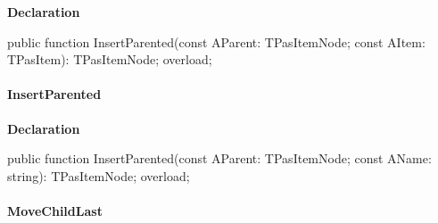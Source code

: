 \documentclass{report}
\newif\ifpdf
\begin{document}
\label{PasDoc_HierarchyTree.TStringCardinalTree-InsertParented}
\begin{list}{}{
\setlength{\itemindent}{0cm}
\setlength{\listparindent}{0cm}
\setlength{\leftmargin}{\evensidemargin}
\addtolength{\leftmargin}{\tmplength}
\settowidth{\labelsep}{X}
\addtolength{\leftmargin}{\labelsep}
\setlength{\labelwidth}{\tmplength}
}
\item[\textbf{Declaration}\hfill]
\ifpdf
\begin{flushleft}
\fi
\begin{ttfamily}
public function InsertParented(const AParent: TPasItemNode; const AItem: TPasItem): TPasItemNode; overload;\end{ttfamily}

\ifpdf
\end{flushleft}
\fi

\end{list}
\paragraph*{InsertParented}\hspace*{\fill}

\label{PasDoc_HierarchyTree.TStringCardinalTree-InsertParented}
\begin{list}{}{
\setlength{\itemindent}{0cm}
\setlength{\listparindent}{0cm}
\setlength{\leftmargin}{\evensidemargin}
\addtolength{\leftmargin}{\tmplength}
\settowidth{\labelsep}{X}
\addtolength{\leftmargin}{\labelsep}
\setlength{\labelwidth}{\tmplength}
}
\item[\textbf{Declaration}\hfill]
\ifpdf
\begin{flushleft}
\fi
\begin{ttfamily}
public function InsertParented(const AParent: TPasItemNode; const AName: string): TPasItemNode; overload;\end{ttfamily}

\ifpdf
\end{flushleft}
\fi

\end{list}
\paragraph*{MoveChildLast}\hspace*{\fill}
\end{document}
